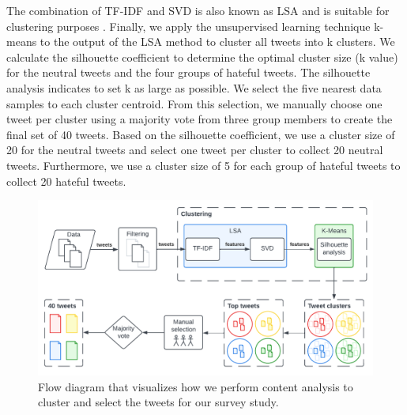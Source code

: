 %
The combination of TF-IDF and SVD is also known as LSA and is suitable for clustering purposes \citep{aggarwal2012survey}.
%
Finally, we apply the unsupervised learning technique k-means to the output of the LSA method to cluster all tweets into k clusters.
%
We calculate the silhouette coefficient to determine the optimal cluster size (k value) for the neutral tweets and the four groups of hateful tweets.
%
The silhouette analysis indicates to set k as large as possible.
%
We select the five nearest data samples to each cluster centroid.
%
From this selection, we manually choose one tweet per cluster using a majority vote from three group members to create the final set of 40 tweets.
%
Based on the silhouette coefficient, we use a cluster size of 20 for the neutral tweets and select one tweet per cluster to collect 20 neutral tweets.
%
Furthermore, we use a cluster size of 5 for each group of hateful tweets to collect 20 hateful tweets.
%
\begin{figure}
    \centering
    \includegraphics[width=\textwidth]{Figures/clustering.pdf}
    \caption{Flow diagram that visualizes how we perform content analysis to cluster and select the tweets for our survey study.}
    \label{fig:clustering}
\end{figure}

